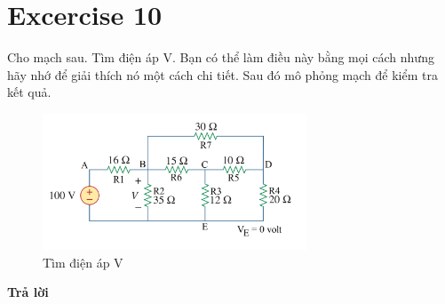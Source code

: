 \section{Excercise 10}
Cho mạch sau. Tìm điện áp V. Bạn có thể làm điều này bằng mọi cách nhưng hãy nhớ để giải thích nó một cách chi tiết. Sau đó mô phỏng mạch để kiểm tra kết quả.\\
\begin{figure}[!htbp]
    \centering
    \includegraphics[width=0.7\textwidth]{graphics/ex10/f1.png}
    \caption{Tìm điện áp V}
\end{figure}
\textbf{Trả lời}
